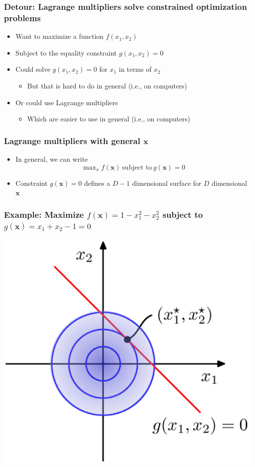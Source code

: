\documentclass[12pt,notes,mathserif]{beamer}
\begin{document}
\begin{frame}[c]
	\frametitle{Detour: Lagrange multipliers solve constrained optimization problems}
	\begin{itemize}
		\item Want to maximize a function $f(x_1,x_2)$
		\item Subject to the equality constraint $g(x_1,x_2)= 0$
		\item Could solve $g(x_1,x_2)= 0$ for $x_1$ in terms of $x_2$
		      \begin{itemize}
			      \item But that is hard to do in general (i.e., on computers)
		      \end{itemize}
		\item Or could use Lagrange multipliers
		      \begin{itemize}
			      \item Which are easier to use in general (i.e., on computers)
		      \end{itemize}
	\end{itemize}
\end{frame}


\begin{frame}[c]
	\frametitle{Lagrange multipliers with general $\mathbf{x}$}
	\begin{itemize}
		\item In general, we can write
		      \[
			      \max\nolimits_x f(\mathbf{x})~\text{subject~to}~g(\mathbf{x})=0
		      \]
		\item Constraint $g(\mathbf{x})= 0$ defines a $D− 1$ dimensional surface for $D$ dimensional $\mathbf{x}$
	\end{itemize}
\end{frame}


\begin{frame}[c]
	\frametitle{Example: Maximize $f(\mathbf{x})=1-x_1^2-x_2^2$ subject to $g(\mathbf{x})=x_1+x_2-1=0$}
	\begin{center}
		\includegraphics[width=0.7\linewidth]{fig8/lec826.jpg}
	\end{center}
\end{frame}
\end{document}
